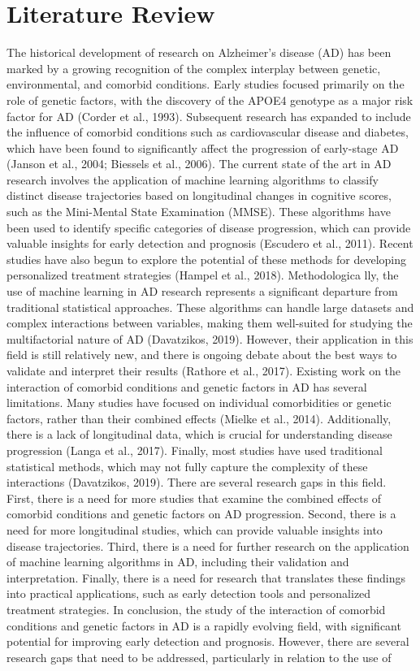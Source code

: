 \documentclass[conference]{IEEEtran}
\begin{document}
\section{Literature Review}
The historical development of research on Alzheimer's disease (AD) has been marked by a growing recognition of the complex interplay between genetic, environmental, and comorbid conditions. Early studies focused primarily on the role of genetic factors, with the discovery of the APOE4 genotype as a major risk factor for AD (Corder et al., 1993). Subsequent research has expanded to include the influence of comorbid conditions such as cardiovascular disease and diabetes, which have been found to significantly affect the progression of early-stage AD (Janson et al., 2004; Biessels et al., 2006). The current state of the art in AD research involves the application of machine learning algorithms to classify distinct disease trajectories based on longitudinal changes in cognitive scores, such as the Mini-Mental State Examination (MMSE). These algorithms have been used to identify specific categories of disease progression, which can provide valuable insights for early detection and prognosis (Escudero et al., 2011). Recent studies have also begun to explore the potential of these methods for developing personalized treatment strategies (Hampel et al., 2018). Methodologica lly, the use of machine learning in AD research represents a significant departure from traditional statistical approaches. These algorithms can handle large datasets and complex interactions between variables, making them well-suited for studying the multifactorial nature of AD (Davatzikos, 2019). However, their application in this field is still relatively new, and there is ongoing debate about the best ways to validate and interpret their results (Rathore et al., 2017). Existing work on the interaction of comorbid conditions and genetic factors in AD has several limitations. Many studies have focused on individual comorbidities or genetic factors, rather than their combined effects (Mielke et al., 2014). Additionally, there is a lack of longitudinal data, which is crucial for understanding disease progression (Langa et al., 2017). Finally, most studies have used traditional statistical methods, which may not fully capture the complexity of these interactions (Davatzikos, 2019). There are several research gaps in this field. First, there is a need for more studies that examine the combined effects of comorbid conditions and genetic factors on AD progression. Second, there is a need for more longitudinal studies, which can provide valuable insights into disease trajectories. Third, there is a need for further research on the application of machine learning algorithms in AD, including their validation and interpretation. Finally, there is a need for research that translates these findings into practical applications, such as early detection tools and personalized treatment strategies. In conclusion, the study of the interaction of comorbid conditions and genetic factors in AD is a rapidly evolving field, with significant potential for improving early detection and prognosis. However, there are several research gaps that need to be addressed, particularly in relation to the use of 
\end{document}
